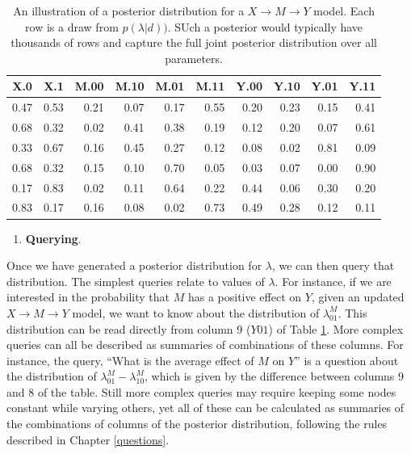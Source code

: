 \documentclass[
  12pt,
]{book}
\providecommand{\tightlist}{%
  \setlength{\itemsep}{0pt}\setlength{\parskip}{0pt}}
\begin{document}
\begin{table}

\caption{\label{tab:posteriortable}An illustration of a posterior distribution for a $X \rightarrow M \rightarrow Y$ model. Each row is a draw from $p(\lambda|d))$. SUch a posterior would typically have thousands of rows and capture the full joint posterior distribution over all parameters.}
\centering
\begin{tabular}[t]{r|r|r|r|r|r|r|r|r|r}
\hline
X.0 & X.1 & M.00 & M.10 & M.01 & M.11 & Y.00 & Y.10 & Y.01 & Y.11\\
\hline
0.47 & 0.53 & 0.21 & 0.07 & 0.17 & 0.55 & 0.20 & 0.23 & 0.15 & 0.41\\
\hline
0.68 & 0.32 & 0.02 & 0.41 & 0.38 & 0.19 & 0.12 & 0.20 & 0.07 & 0.61\\
\hline
0.33 & 0.67 & 0.16 & 0.45 & 0.27 & 0.12 & 0.08 & 0.02 & 0.81 & 0.09\\
\hline
0.68 & 0.32 & 0.15 & 0.10 & 0.70 & 0.05 & 0.03 & 0.07 & 0.00 & 0.90\\
\hline
0.17 & 0.83 & 0.02 & 0.11 & 0.64 & 0.22 & 0.44 & 0.06 & 0.30 & 0.20\\
\hline
0.83 & 0.17 & 0.16 & 0.08 & 0.02 & 0.73 & 0.49 & 0.28 & 0.12 & 0.11\\
\hline
\end{tabular}
\end{table}

\begin{enumerate}
\def\labelenumi{\arabic{enumi}.}
\setcounter{enumi}{4}
\tightlist
\item
  \textbf{Querying}.
\end{enumerate}

Once we have generated a posterior distribution for \(\lambda\), we can then query that distribution. The simplest queries relate to values of \(\lambda\). For instance, if we are interested in the probability that \(M\) has a positive effect on \(Y\), given an updated \(X \rightarrow M \rightarrow Y\) model, we want to know about the distribution of \(\lambda^M_{01}\). This distribution can be read directly from column 9 (\(Y01\)) of Table \ref{tab:posteriortable}. More complex queries can all be described as summaries of combinations of these columns. For instance, the query, ``What is the average effect of \(M\) on \(Y\)'' is a question about the distribution of \(\lambda^M_{01} - \lambda^M_{10}\), which is given by the difference between columns 9 and 8 of the table. Still more complex queries may require keeping some nodes constant while varying others, yet all of these can be calculated as summaries of the combinations of columns of the posterior distribution, following the rules described in Chapter \ref{questions}.
\end{document}
